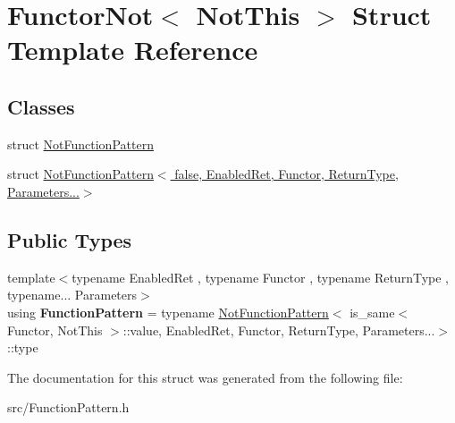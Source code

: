 \hypertarget{struct_functor_not}{\section{Functor\-Not$<$ Not\-This $>$ Struct Template Reference}
\label{struct_functor_not}
}
\subsection*{Classes}
\begin{DoxyCompactItemize}
\item 
struct \hyperlink{struct_functor_not_1_1_not_function_pattern}{Not\-Function\-Pattern}
\item 
struct \hyperlink{struct_functor_not_1_1_not_function_pattern_3_01false_00_01_enabled_ret_00_01_functor_00_01_retufb2ef254b89dd372e341e1801901bc13}{Not\-Function\-Pattern$<$ false, Enabled\-Ret, Functor, Return\-Type, Parameters...$>$}
\end{DoxyCompactItemize}
\subsection*{Public Types}
\begin{DoxyCompactItemize}
\item 
\hypertarget{struct_functor_not_a5a09e3d93586c622e90adaa4b432028a}{{\footnotesize template$<$typename Enabled\-Ret , typename Functor , typename Return\-Type , typename... Parameters$>$ }\\using {\bfseries Function\-Pattern} = typename \hyperlink{struct_functor_not_1_1_not_function_pattern}{Not\-Function\-Pattern}$<$ is\-\_\-same$<$ Functor, Not\-This $>$\-::value, Enabled\-Ret, Functor, Return\-Type, Parameters...$>$\-::type}\label{struct_functor_not_a5a09e3d93586c622e90adaa4b432028a}

\end{DoxyCompactItemize}


The documentation for this struct was generated from the following file\-:\begin{DoxyCompactItemize}
\item 
src/Function\-Pattern.\-h\end{DoxyCompactItemize}
